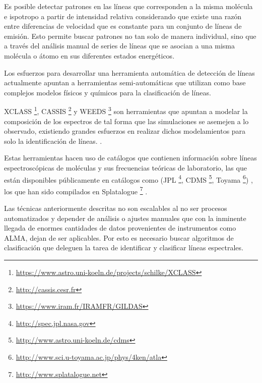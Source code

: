 Es posible detectar patrones en las líneas que corresponden a la misma molécula e ispotropo a partir de intensidad relativa considerando que existe una razón entre diferencias de velocidad que es constante para un conjunto de líneas de emisión. Esto permite buscar patrones no tan solo de manera individual, sino que a través del análisis manual de series de líneas que se asocian a una misma molécula o átomo en sus diferentes estados energéticos. 

Los esfuerzos para desarrollar una herramienta automática de detección de líneas actualmente apuntan a herramientas semi-automáticas que utilizan como base complejos modelos físicos y químicos para la clasificación de líneas. 

XCLASS \footnote{\url{https://www.astro.uni-koeln.de/projects/schilke/XCLASS}}, 
CASSIS \footnote{\url{http://cassis.cesr.fr}} y 
WEEDS \footnote{\url{https://www.iram.fr/IRAMFR/GILDAS}} 
son herramientas que apuntan a modelar la composición de los espectros de tal forma que las simulaciones se asemejen a lo observado, existiendo grandes esfuerzos en realizar dichos modelamientos para solo la identificación de líneas. \cite{Schilke2011}.

Estas herramientas hacen uso de catálogos que contienen información sobre líneas espectroscópicas de moléculas y sus frecuencias teóricas de laboratorio, las que están disponibles públicamente en catálogos como (JPL \footnote{\url{http://spec.jpl.nasa.gov}}, 
CDMS \footnote{\url{http://www.astro.uni-koeln.de/cdms}}, 
Toyama \footnote{\url{http://www.sci.u-toyama.ac.jp/phys/4ken/atla}}) 
\cite{Schilke2011}, los que han sido compilados en 
Splatalogue \footnote{\url{http://www.splatalogue.net}} 
\cite{Remijan2008, Remijan2010}.

Las técnicas anteriormente descritas no son escalables al no ser procesos automatizados y depender de análisis o ajustes manuales que con la inminente llegada de enormes cantidades de datos provenientes de instrumentos como ALMA, dejan de ser aplicables. Por esto es necesario buscar algoritmos de clasificación que deleguen la tarea de identificar y clasificar líneas espectrales.